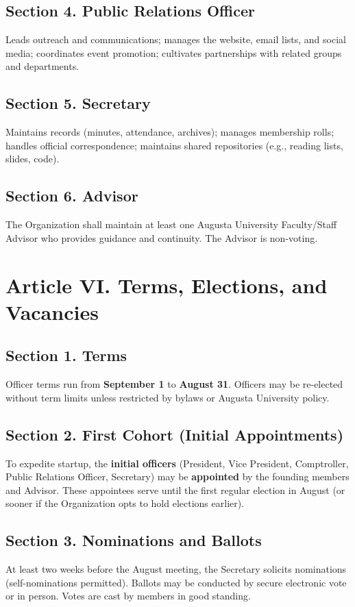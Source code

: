 \documentclass[12pt]{article}
\newcommand{\university}{Augusta University}
\newcommand{\electionmonth}{August}              %
\newcommand{\termbegin}{September 1}             %
\newcommand{\termend}{August 31}                 %
\begin{document}
\subsection*{Section 4. Public Relations Officer}
Leads outreach and communications; manages the website, email lists, and social media; coordinates event promotion; cultivates partnerships with related groups and departments.

\subsection*{Section 5. Secretary}
Maintains records (minutes, attendance, archives); manages membership rolls; handles official correspondence; maintains shared repositories (e.g., reading lists, slides, code).

\subsection*{Section 6. Advisor}
The Organization shall maintain at least one \university{} Faculty/Staff Advisor who provides guidance and continuity. The Advisor is non-voting.

\section*{Article VI. Terms, Elections, and Vacancies}
\subsection*{Section 1. Terms}
Officer terms run from \textbf{\termbegin} to \textbf{\termend}. Officers may be re-elected without term limits unless restricted by bylaws or \university{} policy.

\subsection*{Section 2. First Cohort (Initial Appointments)}
To expedite startup, the \textbf{initial officers} (President, Vice President, Comptroller, Public Relations Officer, Secretary) may be \textbf{appointed} by the founding members and Advisor. These appointees serve until the first regular election in \electionmonth{} (or sooner if the Organization opts to hold elections earlier).

\subsection*{Section 3. Nominations and Ballots}
At least two weeks before the \electionmonth{} meeting, the Secretary solicits nominations (self-nominations permitted). Ballots may be conducted by secure electronic vote or in person. Votes are cast by members in good standing.
\end{document}
